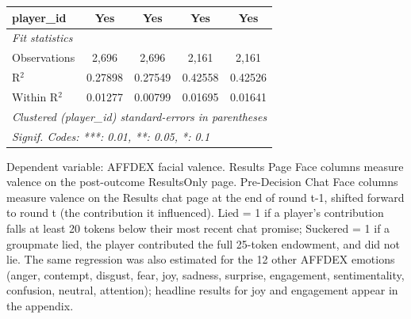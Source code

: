 \begin{tabular}{lcccc}
   player\_id   & Yes           & Yes           & Yes           & Yes\\  
   \midrule
   \emph{Fit statistics}\\
   Observations & 2,696         & 2,696         & 2,161         & 2,161\\  
   R$^2$        & 0.27898       & 0.27549       & 0.42558       & 0.42526\\  
   Within R$^2$ & 0.01277       & 0.00799       & 0.01695       & 0.01641\\  
   \midrule \midrule
   \multicolumn{5}{l}{\emph{Clustered (player\_id) standard-errors in parentheses}}\\
   \multicolumn{5}{l}{\emph{Signif. Codes: ***: 0.01, **: 0.05, *: 0.1}}\\
\end{tabular}
 
\par \raggedright 
Dependent variable: AFFDEX facial valence. Results Page Face columns measure valence on the post-outcome ResultsOnly page. Pre-Decision Chat Face columns measure valence on the Results chat page at the end of round t-1, shifted forward to round t (the contribution it influenced). Lied = 1 if a player's contribution falls at least 20 tokens below their most recent chat promise; Suckered = 1 if a groupmate lied, the player contributed the full 25-token endowment, and did not lie. The same regression was also estimated for the 12 other AFFDEX emotions (anger, contempt, disgust, fear, joy, sadness, surprise, engagement, sentimentality, confusion, neutral, attention); headline results for joy and engagement appear in the appendix.
\par\endgroup


